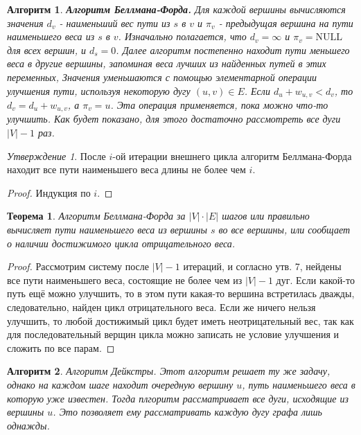 \documentclass[a4paper]{article}
\theoremstyle{indented}
\newtheorem{theorem}{Теорема}
\newtheorem{alg}{Алгоритм}
\theoremstyle{definition}
\theoremstyle{remark}
\newtheorem{stat}{Утверждение}
\begin{document}
\begin{alg}
    \textbf{Алгоритм Беллмана-Форда.} Для каждой вершины вычисляются значения $d_v$ - наименьший вес пути из $s$ в $v$ и $\pi_v$ - предыдущая вершина на пути наименьшего веса из $s$ в $v$. Изначально полагается, что $d_v=\infty$ и $\pi_v=\text{NULL}$ для всех вершин, и $d_s=0$. Далее алгоритм постепенно находит пути меньшего веса в другие вершины, запоминая веса лучших из найденных путей в этих переменных, Значения уменьшаются с помощью элементарной операции улучшения пути, используя некоторую дугу $(u, v)\in E$. Если $d_u+w_{u, v}<d_v$, то $d_v=d_u+w_{u, v}$, а $\pi_v=u$. Эта операция применяется, пока можно что-то улучшить. Как будет показано, для этого достаточно рассмотреть все дуги $|V|-1$ раз.
\end{alg}

\begin{stat}
    После $i$-ой итерации внешнего цикла алгоритм Беллмана-Форда находит все пути наименьшего веса длины не более чем $i$. 
\end{stat}

\begin{proof}
    Индукция по $i$. 
\end{proof}

\begin{theorem}
    Алгоритм Беллмана-Форда за $|V|\cdot|E|$ шагов или правильно вычисляет пути наименьшего веса из вершины $s$ во все вершины, или сообщает о наличии достижимого цикла отрицательного веса. 
\end{theorem}

\begin{proof}
    Рассмотрим систему после $|V|-1$ итераций, и согласно утв. 7, нейдены все пути наименьшего веса, состоящие не более чем из $|V|-1$ дуг. Если какой-то путь ещё можно улучшить, то в этом пути какая-то вершина встретилась дважды, следовательно, найден цикл отрицательного веса. Если же ничего нельзя улучшить, то любой достижимый цикл будет иметь неотрицательный вес, так как для последовательный верщин цикла можно записать не условие улучшения и сложить по все парам.
\end{proof}

\begin{alg}
    Алгоритм Дейкстры. Этот алгоритм решает ту же задачу, однако на каждом шаге находит очередную вершину $u$, путь наименьшего веса в которую уже известен. Тогда плгоритм рассматривает все дуги, исходящие из вершины $u$. Это позволяет ему рассматривать каждую дугу графа лишь однажды.
\end{alg} \
\end{document}
